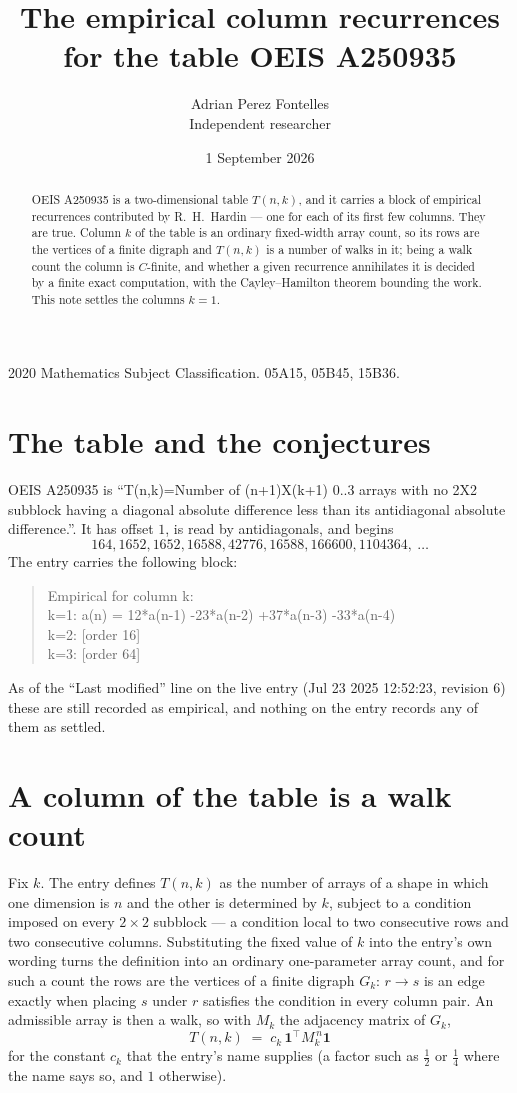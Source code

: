 \documentclass[11pt,a4paper]{article}
\title{The empirical column recurrences for the table OEIS A250935}
\author{Adrian Perez Fontelles\\ \small Independent researcher}
\date{1 September 2026}
\theoremstyle{plain}
\theoremstyle{definition}
\begin{document}
\maketitle

\begin{abstract}
OEIS A250935 is a two-dimensional table $T(n,k)$, and it carries a block of empirical
recurrences contributed by R.~H.~Hardin --- one for each of its first few columns. They are
true. Column $k$ of the table is an ordinary fixed-width array count, so its rows are the
vertices of a finite digraph and $T(n,k)$ is a number of walks in it; being a walk count the
column is $C$-finite, and whether a given recurrence annihilates it is decided by a finite
exact computation, with the Cayley--Hamilton theorem bounding the work. This note settles the
columns $k=1$.
\end{abstract}

\noindent\small 2020 Mathematics Subject Classification. 05A15, 05B45, 15B36.\normalsize

\section{The table and the conjectures}

OEIS A250935 is ``T(n,k)=Number of (n+1)X(k+1) 0..3 arrays with no 2X2 subblock having a diagonal absolute difference less than its antidiagonal absolute difference.''. It has offset $1$, is
read by antidiagonals, and begins
\[
164, 1652, 1652, 16588, 42776, 16588, 166600, 1104364,\ \dots
\]
The entry carries the following block:
\begin{quote}\small
Empirical for column k:\\
k=1: a(n) = 12*a(n-1) -23*a(n-2) +37*a(n-3) -33*a(n-4)\\
k=2: [order 16]\\
k=3: [order 64]\\
\end{quote}
As of the ``Last modified'' line on the live entry (Jul 23 2025 12:52:23, revision 6) these are still
recorded as empirical, and nothing on the entry records any of them as settled.

\section{A column of the table is a walk count}

Fix $k$. The entry defines $T(n,k)$ as the number of arrays of a shape in which one dimension
is $n$ and the other is determined by $k$, subject to a condition imposed on every
$2\times2$ subblock --- a condition local to two consecutive rows and two consecutive columns.
Substituting the fixed value of $k$ into the entry's own wording turns the definition into an
ordinary one-parameter array count, and for such a count the rows are the vertices of a finite
digraph $G_k$: $r\to s$ is an edge exactly when placing $s$ under $r$ satisfies the condition
in every column pair. An admissible array is then a walk, so with $M_k$ the adjacency matrix
of $G_k$,
\[
T(n,k)\;=\;c_k\,\mathbf{1}^{\!\top}M_k^{\,n}\mathbf{1}
\]
for the constant $c_k$ that the entry's name supplies (a factor such as $\tfrac12$ or
$\tfrac14$ where the name says so, and $1$ otherwise).
\end{document}
